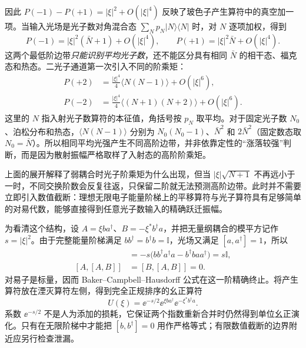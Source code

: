 因此 $P(-1)-P(+1)=|\xi|^2+O(|\xi|^4)$ 反映了玻色子产生算符中的真空加一项。当输入光场是光子数对角混合态 $\sum_Np_N|N\rangle\langle N|$ 时，对 $N$ 逐项加权，得到
\begin{equation}
P(-1)=|\xi|^2(\bar N+1)+O(|\xi|^4),\qquad
P(+1)=|\xi|^2\bar N+O(|\xi|^4).
\label{eq:quantum-first-sidebands}
\end{equation}
这两个最低阶边带\emph{只能识别平均光子数}，还不能区分具有相同 $\bar N$ 的相干态、福克态和热态。二光子通道第一次引入不同的阶乘矩：
\begin{equation}
\begin{aligned}
P(+2)&=\frac{|\xi|^4}{4}\langle N(N-1)\rangle+O(|\xi|^6),\\
P(-2)&=\frac{|\xi|^4}{4}\langle(N+1)(N+2)\rangle+O(|\xi|^6).
\end{aligned}
\label{eq:quantum-second-sidebands}
\end{equation}
这里的 $N$ 指入射光子数算符的本征值，角括号按 $p_N$ 取平均。对于固定光子数 $N_0$、泊松分布和热态，$\langle N(N-1)\rangle$ 分别为
$N_0(N_0-1)$、$\bar N^2$ 和 $2\bar N^2$（固定数态取 $N_0=\bar N$）。所以相同平均光强产生不同高阶边带，并非依靠定性的“涨落较强”判断，而是因为散射振幅严格取样了入射态的高阶阶乘矩。

上面的展开解释了弱耦合时光子阶乘矩为什么出现，但当 $|\xi|\sqrt{N+1}$ 不再远小于一时，不同交换阶数会反复往返，只保留二阶就无法预测高阶边带。此时并不需要立即引入数值截断：理想无限电子能量阶梯上的平移算符与光子算符具有足够简单的对易代数，能够直接得到任意光子数输入的精确跃迁振幅。

为看清这个结构，设 $A=\xi b a^\dagger$、$B=-\xi^*b^\dagger a$，并把无量纲耦合的模平方记作 $s=|\xi|^2$。由于完整能量阶梯满足 $bb^\dagger=b^\dagger b=\mathbb I$，光场又满足 $[a,a^\dagger]=1$，所以
\begin{align*}
[A,B]&=-s\bigl(bb^\dagger a^\dagger a-b^\dagger b aa^\dagger\bigr)=s\mathbb I,\\
[A,[A,B]]&=[B,[A,B]]=0.
\end{align*}
对易子是标量，因而 Baker--Campbell--Hausdorff 公式在这一阶精确终止。将产生算符放在湮灭算符左侧，得到完全正规排序的幺正算符
\begin{equation}
U(\xi)=\ee^{-s/2}\ee^{\xi b a^\dagger}\ee^{-\xi^*b^\dagger a}.
\label{eq:quantum-normal-order}
\end{equation}
系数 $\ee^{-s/2}$ 不是人为添加的损耗，它保证两个指数重新合并时仍然得到单位幺正演化。只有在无限阶梯中才能把 $[b,b^\dagger]=0$ 用作严格等式；有限数值截断的边界附近应另行检查泄漏。

